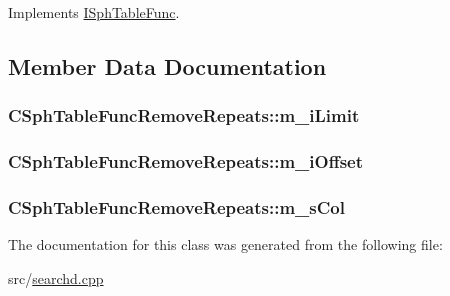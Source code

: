 Implements \hyperlink{classISphTableFunc_a768e16ed33f4f013cd65b77beaa5a246}{I\-Sph\-Table\-Func}.



\subsection{Member Data Documentation}
\hypertarget{classCSphTableFuncRemoveRepeats_ac2abf33ea9880a9acc21a78c1ef4a807}{
\subsubsection[{m\-\_\-i\-Limit}]{ C\-Sph\-Table\-Func\-Remove\-Repeats\-::m\-\_\-i\-Limit\hspace{0.3cm}{\ttfamily [protected]}}}\label{classCSphTableFuncRemoveRepeats_ac2abf33ea9880a9acc21a78c1ef4a807}
\hypertarget{classCSphTableFuncRemoveRepeats_a6c429401d6a02e6781dcdf941cfba697}{
\subsubsection[{m\-\_\-i\-Offset}]{ C\-Sph\-Table\-Func\-Remove\-Repeats\-::m\-\_\-i\-Offset\hspace{0.3cm}{\ttfamily [protected]}}}\label{classCSphTableFuncRemoveRepeats_a6c429401d6a02e6781dcdf941cfba697}
\hypertarget{classCSphTableFuncRemoveRepeats_ad32804b2637e258723b8c395bbbdaf24}{
\subsubsection[{m\-\_\-s\-Col}]{ C\-Sph\-Table\-Func\-Remove\-Repeats\-::m\-\_\-s\-Col\hspace{0.3cm}{\ttfamily [protected]}}}\label{classCSphTableFuncRemoveRepeats_ad32804b2637e258723b8c395bbbdaf24}


The documentation for this class was generated from the following file\-:\begin{DoxyCompactItemize}
\item 
src/\hyperlink{searchd_8cpp}{searchd.\-cpp}\end{DoxyCompactItemize}
